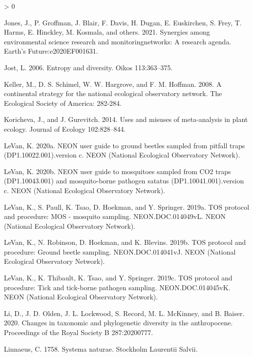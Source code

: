 \documentclass[
  12pt,
]{article}
\newlength{\cslhangindent}
\newenvironment{CSLReferences}[2] %
 {%
  \setlength{\parindent}{0pt}
  \ifodd #1 \everypar{\setlength{\hangindent}{\cslhangindent}}\ignorespaces\fi
  \ifnum #2 > 0
  \setlength{\parskip}{#2\baselineskip}
  \fi
 }%
 {}
\begin{document}
\begin{CSLReferences}{1}{0}
\leavevmode\hypertarget{ref-jones2021synergies}{}%
Jones, J., P. Groffman, J. Blair, F. Davis, H. Dugan, E. Euskirchen, S. Frey, T. Harms, E. Hinckley, M. Kosmala, and others. 2021. Synergies among environmental science research and monitoringnetworks: A research agenda. Earth's Future:e2020EF001631.

\leavevmode\hypertarget{ref-jost2006entropy}{}%
Jost, L. 2006. Entropy and diversity. Oikos 113:363--375.

\leavevmode\hypertarget{ref-keller2008continental}{}%
Keller, M., D. S. Schimel, W. W. Hargrove, and F. M. Hoffman. 2008. A continental strategy for the national ecological observatory network. The Ecological Society of America: 282-284.

\leavevmode\hypertarget{ref-koricheva2014uses}{}%
Koricheva, J., and J. Gurevitch. 2014. Uses and misuses of meta-analysis in plant ecology. Journal of Ecology 102:828--844.

\leavevmode\hypertarget{ref-LeVan2020}{}%
LeVan, K. 2020a. NEON user guide to ground beetles sampled from pitfall traps (DP1.10022.001).version c. NEON (National Ecological Observatory Network).

\leavevmode\hypertarget{ref-LeVan2020b}{}%
LeVan, K. 2020b. NEON user guide to mosquitoes sampled from CO2 traps (DP1.10043.001) and mosquito-borne pathogen satatus (DP1.10041.001).version c. NEON (National Ecological Observatory Network).

\leavevmode\hypertarget{ref-LeVan2019b}{}%
LeVan, K., S. Paull, K. Tsao, D. Hoekman, and Y. Springer. 2019a. TOS protocol and procedure: MOS - mosquito sampling. NEON.DOC.014049vL. NEON (National Ecological Observatory Network).

\leavevmode\hypertarget{ref-LeVan2019}{}%
LeVan, K., N. Robinson, D. Hoekman, and K. Blevins. 2019b. TOS protocol and procedure: Ground beetle sampling. NEON.DOC.014041vJ. NEON (National Ecological Observatory Network).

\leavevmode\hypertarget{ref-LeVan2019c}{}%
LeVan, K., K. Thibault, K. Tsao, and Y. Springer. 2019c. TOS protocol and procedure: Tick and tick-borne pathogen sampling. NEON.DOC.014045vK. NEON (National Ecological Observatory Network).

\leavevmode\hypertarget{ref-li2020changes}{}%
Li, D., J. D. Olden, J. L. Lockwood, S. Record, M. L. McKinney, and B. Baiser. 2020. Changes in taxonomic and phylogenetic diversity in the anthropocene. Proceedings of the Royal Society B 287:20200777.

\leavevmode\hypertarget{ref-linnaeus1758systema}{}%
Linnaeus, C. 1758. Systema naturae. Stockholm Laurentii Salvii.


\end{CSLReferences}
\end{document}
